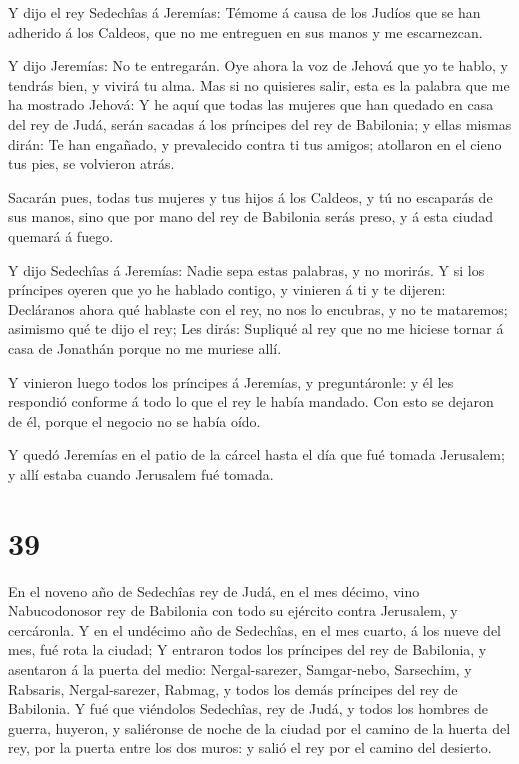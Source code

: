  Y dijo el rey Sedechîas á Jeremías: Témome á causa de los
Judíos que se han adherido á los Caldeos, que no me entreguen en sus
manos y me escarnezcan.

 Y dijo Jeremías: No te entregarán. Oye ahora la voz de
Jehová que yo te hablo, y tendrás bien, y vivirá tu alma. 
Mas si no quisieres salir, esta es la palabra que me ha mostrado Jehová:
 Y he aquí que todas las mujeres que han quedado en casa
del rey de Judá, serán sacadas á los príncipes del rey de Babilonia; y
ellas mismas dirán: Te han engañado, y prevalecido contra ti tus amigos;
atollaron en el cieno tus pies, se volvieron atrás.

 Sacarán pues, todas tus mujeres y tus hijos á los Caldeos,
y tú no escaparás de sus manos, sino que por mano del rey de Babilonia
serás preso, y á esta ciudad quemará á fuego.

 Y dijo Sedechîas á Jeremías: Nadie sepa estas palabras, y
no morirás.  Y si los príncipes oyeren que yo he hablado
contigo, y vinieren á ti y te dijeren: Decláranos ahora qué hablaste con
el rey, no nos lo encubras, y no te mataremos; asimismo qué te dijo el
rey;  Les dirás: Supliqué al rey que no me hiciese tornar á
casa de Jonathán porque no me muriese allí.

 Y vinieron luego todos los príncipes á Jeremías, y
preguntáronle: y él les respondió conforme á todo lo que el rey le había
mandado. Con esto se dejaron de él, porque el negocio no se había oído.

 Y quedó Jeremías en el patio de la cárcel hasta el día que
fué tomada Jerusalem; y allí estaba cuando Jerusalem fué tomada.

\hypertarget{section-38}{%
\section{39}\label{section-38}}

 En el noveno año de Sedechîas rey de Judá, en el mes
décimo, vino Nabucodonosor rey de Babilonia con todo su ejército contra
Jerusalem, y cercáronla.  Y en el undécimo año de Sedechîas,
en el mes cuarto, á los nueve del mes, fué rota la ciudad; 
Y entraron todos los príncipes del rey de Babilonia, y asentaron á la
puerta del medio: Nergal-sarezer, Samgar-nebo, Sarsechim, y Rabsaris,
Nergal-sarezer, Rabmag, y todos los demás príncipes del rey de
Babilonia.  Y fué que viéndolos Sedechîas, rey de Judá, y
todos los hombres de guerra, huyeron, y saliéronse de noche de la ciudad
por el camino de la huerta del rey, por la puerta entre los dos muros: y
salió el rey por el camino del desierto.

